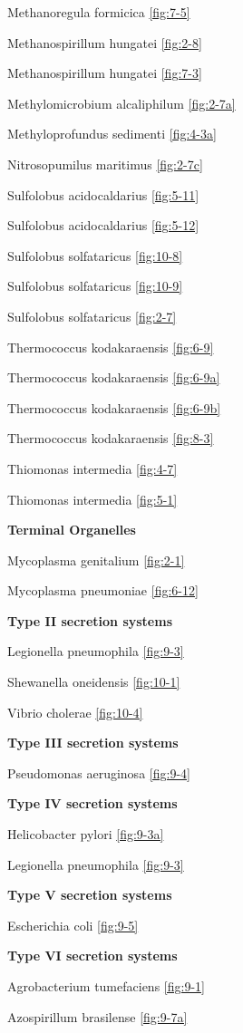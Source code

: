 \documentclass[]{tufte-book}
\begin{document}
Methanoregula formicica \ref{fig:7-5}

Methanospirillum hungatei \ref{fig:2-8}

Methanospirillum hungatei \ref{fig:7-3}

Methylomicrobium alcaliphilum \ref{fig:2-7a}

Methyloprofundus sedimenti \ref{fig:4-3a}

Nitrosopumilus maritimus \ref{fig:2-7c}

Sulfolobus acidocaldarius \ref{fig:5-11}

Sulfolobus acidocaldarius \ref{fig:5-12}

Sulfolobus solfataricus \ref{fig:10-8}

Sulfolobus solfataricus \ref{fig:10-9}

Sulfolobus solfataricus \ref{fig:2-7}

Thermococcus kodakaraensis \ref{fig:6-9}

Thermococcus kodakaraensis \ref{fig:6-9a}

Thermococcus kodakaraensis \ref{fig:6-9b}

Thermococcus kodakaraensis \ref{fig:8-3}

Thiomonas intermedia \ref{fig:4-7}

Thiomonas intermedia \ref{fig:5-1}

\textbf{Terminal Organelles}

Mycoplasma genitalium \ref{fig:2-1}

Mycoplasma pneumoniae \ref{fig:6-12}

\textbf{Type II secretion systems}

Legionella pneumophila \ref{fig:9-3}

Shewanella oneidensis \ref{fig:10-1}

Vibrio cholerae \ref{fig:10-4}

\textbf{Type III secretion systems}

Pseudomonas aeruginosa \ref{fig:9-4}

\textbf{Type IV secretion systems}

Helicobacter pylori \ref{fig:9-3a}

Legionella pneumophila \ref{fig:9-3}

\textbf{Type V secretion systems}

Escherichia coli \ref{fig:9-5}

\textbf{Type VI secretion systems}

Agrobacterium tumefaciens \ref{fig:9-1}

Azospirillum brasilense \ref{fig:9-7a}
\end{document}
